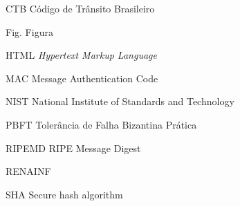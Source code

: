 \begin{siglas}
  \item[CTB] Código de Trânsito Brasileiro
  \item[Fig.] Figura
  \item[HTML] \textit{Hypertext Markup Language}
  \item[MAC] Message Authentication Code
  \item[NIST] National Institute of Standards and Technology
  \item[PBFT] Tolerância de Falha Bizantina Prática
  \item[RIPEMD] RIPE Message Digest
  \item[RENAINF] 
  \item[SHA] Secure hash algorithm
\end{siglas}
